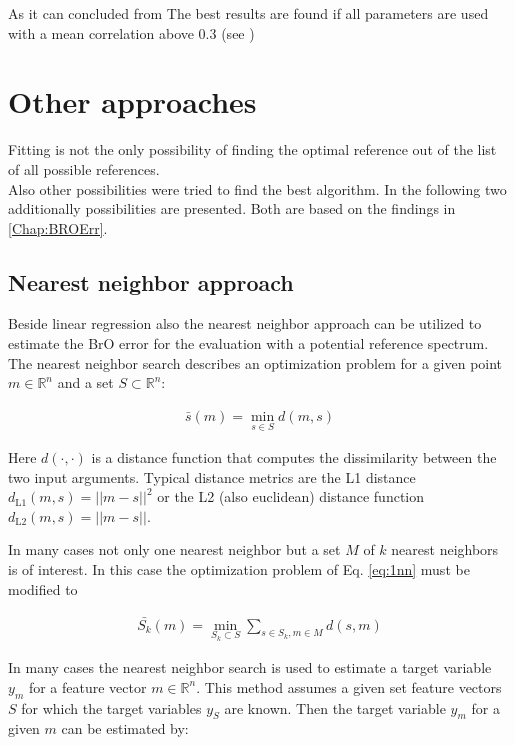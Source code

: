 \documentclass  [
  paper    = a4,
  BCOR     = 10mm,
  twoside,
  fontsize = 12pt,
  fleqn,
  toc      = bibnumbered,
  toc      = listofnumbered,
  numbers  = noendperiod,
  headings = normal,
  listof   = leveldown,
  version  = 3.03
]                                       {scrreprt}
\begin{document}
	As it can concluded from  The best results are found if all parameters are used with a mean correlation above 0.3 (see )
	\section{Other approaches}

	Fitting is not the only possibility of finding the optimal reference out of the list of all possible references.\\
	Also other possibilities were tried to find the best algorithm. In the following two additionally possibilities are presented. Both are based on the findings in \cref{Chap:BROErr}. 

\subsection{Nearest neighbor approach}


Beside linear regression also the nearest neighbor approach can be utilized to estimate the BrO error for the evaluation with a potential reference spectrum.
%
The nearest neighbor search describes an optimization problem for a given point $m \in \mathbb{R}^n$ and a set $S \subset \mathbb{R}^n$:

%

\begin{align}
\bar{s}(m) = \min_{s \in S} d(m, s) \label{eq:1nn}
\end{align}

%
Here $d(\cdot, \cdot)$ is a distance function that computes the dissimilarity between the two input arguments. Typical distance metrics are the L1 distance $d_{\text{L1} 	
}(m, s) = ||m - s||^2$ or the L2 (also euclidean) distance function $d_{\text{L2} 
}(m, s) = ||m - s||$. 


In many cases not only one nearest neighbor but a set $M$ of $k$ nearest neighbors is of interest. In this case the optimization problem of Eq. \ref{eq:1nn} must be modified to

%

\begin{align}
\bar{S_k}(m) = \min_{S_k \subset S} \sum_{s \in S_k, m \in M} d(s, m) \label{eq:knn}
\end{align}

%

In many cases the nearest neighbor search is used to estimate a target variable $y_m$ for a feature vector $m \in \mathbb{R}^n$. This method assumes a given set feature vectors $S$ for which the target variables $y_S$ are known. Then the target variable $y_m$ for a given $m$ can be estimated by:
\end{document}
